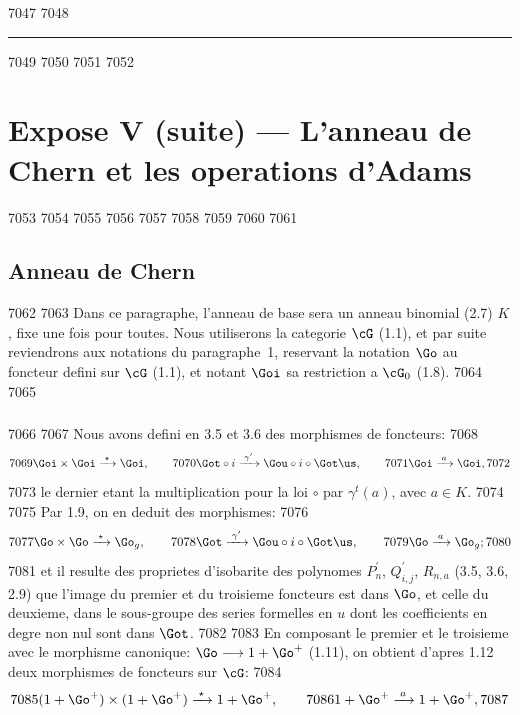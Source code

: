   7047	
  7048	\noindent\rule{\textwidth}{0.5pt}
  7049	
  7050	\vspace{1em}
  7051	
  7052	\section*{Expose V (suite) --- L'anneau de Chern et les operations d'Adams}
  7053	
  7054	\setcounter{section}{5}
  7055	\setcounter{subsection}{0}
  7056	\setcounter{thm}{0}
  7057	
  7058	%
  7059	%
  7060	%
  7061	\subsection{Anneau de Chern}
  7062	
  7063	Dans ce paragraphe, l'anneau de base sera un anneau binomial (2.7) $K$, fixe une fois pour toutes. Nous utiliserons la categorie $\cG$ (1.1), et par suite reviendrons aux notations du paragraphe~1, reservant la notation $\Go$ au foncteur defini sur $\cG$ (1.1), et notant $\Goi$ sa restriction a $\cG_0$ (1.8).
  7064	
  7065	\subsubsection{}
  7066	
  7067	Nous avons defini en 3.5 et 3.6 des morphismes de foncteurs:
  7068	\[
  7069	\Goi \times \Goi \xrightarrow{\;\star\;} \Goi,\qquad
  7070	\Got \circ i \xrightarrow{\;\gamma^{\prime}\;} \Gou \circ i \circ \Got\us,\qquad
  7071	\Goi \xrightarrow{\;a\;} \Goi,
  7072	\]
  7073	le dernier etant la multiplication pour la loi $\circ$ par $\gamma^t(a)$, avec $a \in K$.
  7074	
  7075	Par 1.9, on en deduit des morphismes:
  7076	\[
  7077	\Go \times \Go \xrightarrow{\;\star\;} \Go_g,\qquad
  7078	\Got \xrightarrow{\;\gamma^{\prime}\;} \Gou \circ i \circ \Got\us,\qquad
  7079	\Go \xrightarrow{\;a\;} \Go_g;
  7080	\]
  7081	et il resulte des proprietes d'isobarite des polynomes $P^\prime_n$, $Q^\prime_{i,j}$, $R_{n,a}$ (3.5, 3.6, 2.9) que l'image du premier et du troisieme foncteurs est dans $\Go$, et celle du deuxieme, dans le sous-groupe des series formelles en $u$ dont les coefficients en degre non nul sont dans $\Got$.
  7082	
  7083	En composant le premier et le troisieme avec le morphisme canonique: $\Go \longrightarrow 1 + \Go^+$ (1.11), on obtient d'apres 1.12 deux morphismes de foncteurs sur $\cG$:
  7084	\[
  7085	(1 + \Go^+) \times (1 + \Go^+) \xrightarrow{\;\star\;} 1 + \Go^+,\qquad
  7086	1 + \Go^+ \xrightarrow{\;a\;} 1 + \Go^+,
  7087	\]
